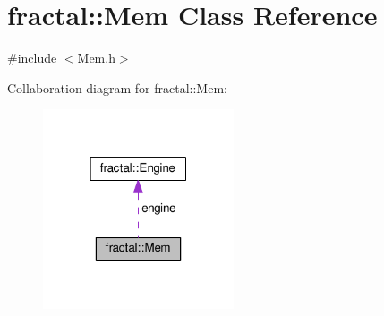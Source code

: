 \hypertarget{classfractal_1_1Mem}{\section{fractal\+:\+:Mem Class Reference}
\label{classfractal_1_1Mem}
}


{\ttfamily \#include $<$Mem.\+h$>$}



Collaboration diagram for fractal\+:\+:Mem\+:\nopagebreak
\begin{figure}[H]
\begin{center}
\leavevmode
\includegraphics[width=160pt]{d4/d05/classfractal_1_1Mem__coll__graph}
\end{center}
\end{figure}
